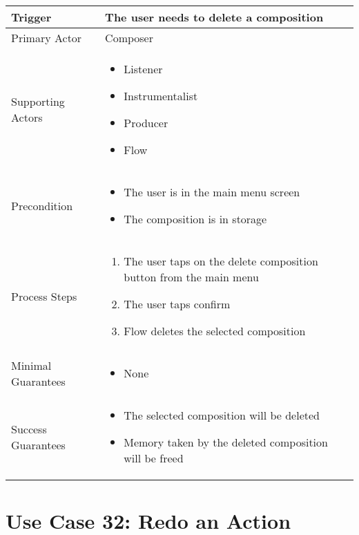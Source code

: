   \begin{tabularx}{\textwidth}{|X|X|}
  \hline
  Trigger & 
  The user needs to delete a composition \\
  \hline
  Primary Actor & 
  Composer \\
  \hline
  Supporting Actors & 
  \begin{itemize}
  \item Listener
  \item Instrumentalist
  \item Producer
  \item Flow
  \end{itemize} \\
  \hline
  Precondition & 
  \begin{itemize}
  \item The user is in the main menu screen
  \item The composition is in storage
  \end{itemize} \\
  \hline
  Process Steps & 
  \begin{enumerate}
  \item The user taps on the delete composition button from the main menu
  \item The user taps confirm
  \item Flow deletes the selected composition
  \end{enumerate} \\
  \hline
  Minimal Guarantees & 
  \begin{itemize}
    \item None
  \end{itemize} \\
  \hline
  Success Guarantees & 
  \begin{itemize}
    \item The selected composition will be deleted
    \item Memory taken by the deleted composition will be freed
  \end{itemize} \\
  \hline
  \end{tabularx}

  \section{Use Case 32: Redo an Action}

